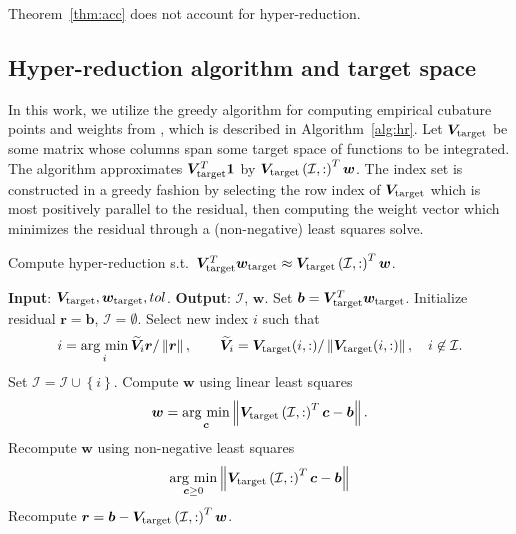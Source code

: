\documentclass[review]{siamart171218}
\DeclareMathOperator*{\argmin}{\arg\,\min}
\theoremstyle{assumption}
\renewcommand{\tilde}{\widetilde}
\newcommand{\nor}[1]{\left\| #1 \right\|}
\newcommand{\LRp}[1]{\left( #1 \right)}
\newcommand{\LRc}[1]{\left\{ #1 \right\}}
\begin{document}
Theorem~\ref{thm:acc} does not account for hyper-reduction.   

\subsection{Hyper-reduction algorithm and target space}
\label{sec:hyperreducalgo}

In this work, we utilize the greedy algorithm for computing empirical cubature points and weights from \cite{an2008optimizing, hernandez2017dimensional}, which is described in Algorithm~\ref{alg:hr}.  Let $\bm{V}_{\rm target}$ be some matrix whose columns span some target space of functions to be integrated.  The algorithm approximates $\bm{V}_{\rm target}^T\bm{1}$ by $\bm{V}_{\rm target}\LRp{\mathcal{I},:}^T\bm{w}$.  The index set is constructed in a greedy fashion by selecting the row index of $\bm{V}_{\rm target}$ which is most positively parallel to the residual, then computing the weight vector which minimizes the residual through a (non-negative) least squares solve.  

\begin{algorithm}
\caption{Compute hyper-reduction s.t.\ $\bm{V}_{\rm target}^T\bm{w}_{\rm target} \approx \bm{V}_{\rm target}\LRp{\mathcal{I},:}^T\bm{w}$.}
\begin{algorithmic}[1]
\STATE \textbf{Input}: $\bm{V}_{\rm target}, \bm{w}_{\rm target}, tol$.
\STATE \textbf{Output}: $\mathcal{I}$, $\bm{w}$.
\STATE Set $\bm{b} = \bm{V}_{\rm target}^T\bm{w}_{\rm target}$.
\STATE Initialize residual $\bm{r} = \bm{b}$, $\mathcal{I} = \emptyset$.
\WHILE {$\nor{\bm{r}}/\nor{\bm{b}} > tol$}
        \STATE Select new index $i$ such that
        \[
        i = \argmin_i \tilde{\bm{V}}_{i}\bm{r}/\nor{\bm{r}}, \qquad
        \tilde{\bm{V}}_i = \bm{V}_{\rm target}(i,:) / \nor{\bm{V}_{\rm target}(i,:)}, \quad i \not\in \mathcal{I}.
        \]
        \STATE Set $\mathcal{I} = \mathcal{I} \cup \LRc{i}$.  
        \STATE Compute $\bm{w}$ using linear least squares
        \[
        \bm{w} = \argmin_{\bm{c}} \nor{\bm{V}_{\rm target}\LRp{\mathcal{I},:}^T\bm{c} - \bm{b}}.
        \]
                \STATE Recompute $\bm{w}$ using non-negative least squares 
                \[
                \argmin_{\bm{c} \geq 0} \nor{\bm{V}_{\rm target}\LRp{\mathcal{I},:}^T\bm{c} - \bm{b}}
                \]             
        \ENDIF
        \STATE Recompute $\bm{r} = \bm{b} - \bm{V}_{\rm target}\LRp{\mathcal{I},:}^T\bm{w}$.
\ENDWHILE
\end{algorithmic}
\label{alg:hr}
\end{algorithm}
\end{document}

